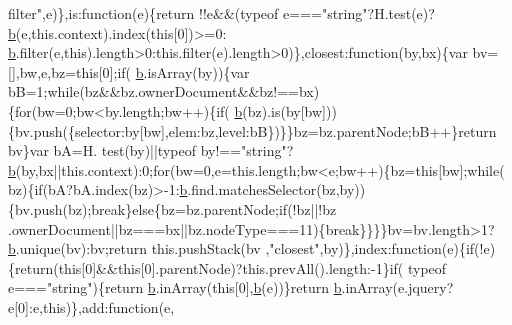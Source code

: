 \begin{DoxyCode}
{      filter"},e)\},is:\textcolor{keyword}{function}(e)\{\textcolor{keywordflow}{return} !!e&&(typeof e===\textcolor{stringliteral}{"string"}?H.test(e)?\hyperlink{docs_2_programmer's_manual_2html_2jquery_8js_aa4026ad5544b958e54ce5e106fa1c805}{b}(e,this.context).index(\textcolor{keyword}{this}[0])>=0:
      \hyperlink{docs_2_programmer's_manual_2html_2jquery_8js_aa4026ad5544b958e54ce5e106fa1c805}{b}.filter(e,\textcolor{keyword}{this}).length>0:this.filter(e).length>0)\},closest:\textcolor{keyword}{function}(by,bx)\{var bv=[],bw,e,bz=\textcolor{keyword}{this}[0];\textcolor{keywordflow}{if}(
      \hyperlink{docs_2_programmer's_manual_2html_2jquery_8js_aa4026ad5544b958e54ce5e106fa1c805}{b}.isArray(by))\{var bB=1;\textcolor{keywordflow}{while}(bz&&bz.ownerDocument&&bz!==bx)\{\textcolor{keywordflow}{for}(bw=0;bw<by.length;bw++)\{\textcolor{keywordflow}{if}(
      \hyperlink{docs_2_programmer's_manual_2html_2jquery_8js_aa4026ad5544b958e54ce5e106fa1c805}{b}(bz).is(by[bw]))\{bv.push(\{selector:by[bw],elem:bz,level:bB\})\}\}bz=bz.parentNode;bB++\}\textcolor{keywordflow}{return} bv\}var bA=H.
      test(by)||typeof by!==\textcolor{stringliteral}{"string"}?\hyperlink{docs_2_programmer's_manual_2html_2jquery_8js_aa4026ad5544b958e54ce5e106fa1c805}{b}(by,bx||this.context):0;\textcolor{keywordflow}{for}(bw=0,e=this.length;bw<e;bw++)\{bz=\textcolor{keyword}{this}[bw];\textcolor{keywordflow}{while}(
      bz)\{\textcolor{keywordflow}{if}(bA?bA.index(bz)>-1:\hyperlink{docs_2_programmer's_manual_2html_2jquery_8js_aa4026ad5544b958e54ce5e106fa1c805}{b}.find.matchesSelector(bz,by))\{bv.push(bz);\textcolor{keywordflow}{break}\}\textcolor{keywordflow}{else}\{bz=bz.parentNode;\textcolor{keywordflow}{if}(!bz||!bz
      .ownerDocument||bz===bx||bz.nodeType===11)\{\textcolor{keywordflow}{break}\}\}\}\}bv=bv.length>1?\hyperlink{docs_2_programmer's_manual_2html_2jquery_8js_aa4026ad5544b958e54ce5e106fa1c805}{b}.unique(bv):bv;\textcolor{keywordflow}{return} this.pushStack(bv
      ,\textcolor{stringliteral}{"closest"},by)\},index:\textcolor{keyword}{function}(e)\{\textcolor{keywordflow}{if}(!e)\{\textcolor{keywordflow}{return}(\textcolor{keyword}{this}[0]&&\textcolor{keyword}{this}[0].parentNode)?this.prevAll().length:-1\}\textcolor{keywordflow}{if}(
      typeof e===\textcolor{stringliteral}{"string"})\{\textcolor{keywordflow}{return} \hyperlink{docs_2_programmer's_manual_2html_2jquery_8js_aa4026ad5544b958e54ce5e106fa1c805}{b}.inArray(\textcolor{keyword}{this}[0],\hyperlink{docs_2_programmer's_manual_2html_2jquery_8js_aa4026ad5544b958e54ce5e106fa1c805}{b}(e))\}\textcolor{keywordflow}{return} \hyperlink{docs_2_programmer's_manual_2html_2jquery_8js_aa4026ad5544b958e54ce5e106fa1c805}{b}.inArray(e.jquery?e[0]:e,\textcolor{keyword}{this})\},add:\textcolor{keyword}{function}(e,

\end{DoxyCode}
